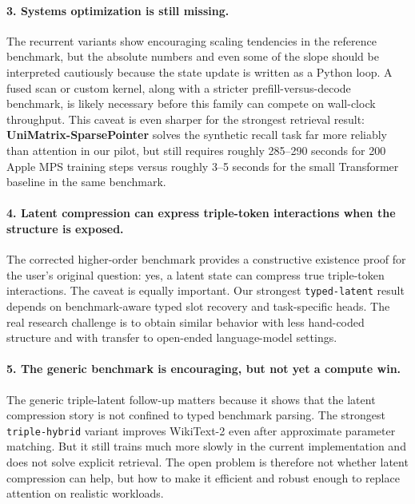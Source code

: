 \documentclass[11pt]{article}
\begin{document}
\paragraph{3. Systems optimization is still missing.}
The recurrent variants show encouraging scaling tendencies in the reference
benchmark, but the absolute numbers and even some of the slope should be
interpreted cautiously because the state update is written as a Python loop. A
fused scan or custom kernel, along with a stricter prefill-versus-decode
benchmark, is likely necessary before this family can compete on wall-clock
throughput. This caveat is even sharper for the strongest retrieval result:
\textbf{UniMatrix-SparsePointer} solves the synthetic recall task far more
reliably than attention in our pilot, but still requires roughly 285--290
seconds for 200 Apple MPS training steps versus roughly 3--5 seconds for the
small Transformer baseline in the same benchmark.

\paragraph{4. Latent compression can express triple-token interactions when the structure is exposed.}
The corrected higher-order benchmark provides a constructive existence proof
for the user's original question: yes, a latent state can compress true
triple-token interactions. The caveat is equally important. Our strongest
\texttt{typed-latent} result depends on benchmark-aware typed slot recovery and
task-specific heads. The real research challenge is to obtain similar behavior
with less hand-coded structure and with transfer to open-ended language-model
settings.

\paragraph{5. The generic benchmark is encouraging, but not yet a compute win.}
The generic triple-latent follow-up matters because it shows that the latent
compression story is not confined to typed benchmark parsing. The strongest
\texttt{triple-hybrid} variant improves WikiText-2 even after approximate
parameter matching. But it still trains much more slowly in the current
implementation and does not solve explicit retrieval. The open problem is
therefore not whether latent compression can help, but how to make it
efficient and robust enough to replace attention on realistic workloads.
\end{document}
